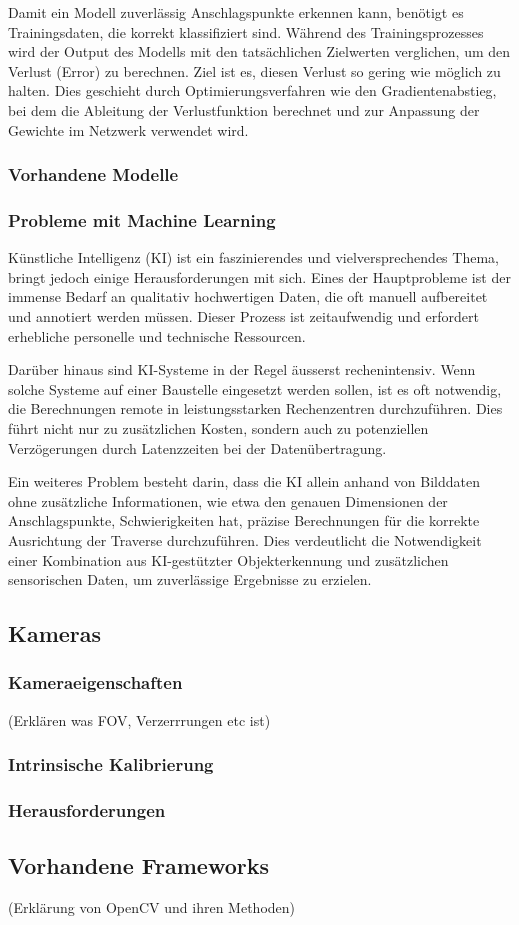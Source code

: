 Damit ein Modell zuverlässig Anschlagspunkte erkennen kann, benötigt es Trainingsdaten, die korrekt klassifiziert sind. 
Während des Trainingsprozesses wird der Output des Modells mit den tatsächlichen Zielwerten verglichen, um den Verlust (Error) 
zu berechnen. Ziel ist es, diesen Verlust so gering wie möglich zu halten. Dies geschieht durch Optimierungsverfahren wie den 
Gradientenabstieg, bei dem die Ableitung der Verlustfunktion berechnet und zur Anpassung der Gewichte im Netzwerk verwendet wird.


\subsubsection{Vorhandene Modelle}


\subsubsection{Probleme mit Machine Learning}
Künstliche Intelligenz (KI) ist ein faszinierendes und vielversprechendes Thema, bringt 
jedoch einige Herausforderungen mit sich. Eines der Hauptprobleme ist der immense Bedarf 
an qualitativ hochwertigen Daten, die oft manuell aufbereitet und annotiert werden müssen. 
Dieser Prozess ist zeitaufwendig und erfordert erhebliche personelle und technische Ressourcen.

Darüber hinaus sind KI-Systeme in der Regel äusserst rechenintensiv. Wenn solche Systeme auf
einer Baustelle eingesetzt werden sollen, ist es oft notwendig, die Berechnungen remote in 
leistungsstarken Rechenzentren durchzuführen. Dies führt nicht nur zu zusätzlichen Kosten, 
sondern auch zu potenziellen Verzögerungen durch Latenzzeiten bei der Datenübertragung.

Ein weiteres Problem besteht darin, dass die KI allein anhand von Bilddaten ohne zusätzliche 
Informationen, wie etwa den genauen Dimensionen der Anschlagspunkte, Schwierigkeiten hat, 
präzise Berechnungen für die korrekte Ausrichtung der Traverse durchzuführen.
Dies verdeutlicht die Notwendigkeit einer Kombination aus KI-gestützter Objekterkennung und 
zusätzlichen sensorischen Daten, um zuverlässige Ergebnisse zu erzielen.

\subsection{Kameras}
\subsubsection{Kameraeigenschaften}
(Erklären was FOV, Verzerrrungen etc ist)
\subsubsection{Intrinsische Kalibrierung}
\subsubsection{Herausforderungen}

\subsection{Vorhandene Frameworks}
(Erklärung von OpenCV und ihren Methoden)

